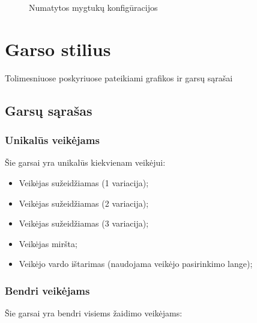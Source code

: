 \documentclass{VUMIFPSkursinis}
\begin{document}
\begin{figure}[h!]
\centering
\caption{Numatytos mygtukų konfigūracijos}
\label{tab:BtnConfigs}
\end{figure}



\section{Garso stilius}
Tolimesniuose poskyriuose pateikiami grafikos ir garsų sąrašai


\subsection{Garsų sąrašas}


\subsubsection{Unikalūs veikėjams}
Šie garsai yra unikalūs kiekvienam veikėjui:

\begin{itemize}
    \item Veikėjas sužeidžiamas (1 variacija);
    \item Veikėjas sužeidžiamas (2 variacija);
    \item Veikėjas sužeidžiamas (3 variacija);
    \item Veikėjas miršta;
    \item Veikėjo vardo ištarimas (naudojama veikėjo pasirinkimo lange);
\end{itemize}

\subsubsection{Bendri veikėjams}
Šie garsai yra bendri visiems žaidimo veikėjams:
\end{document}
